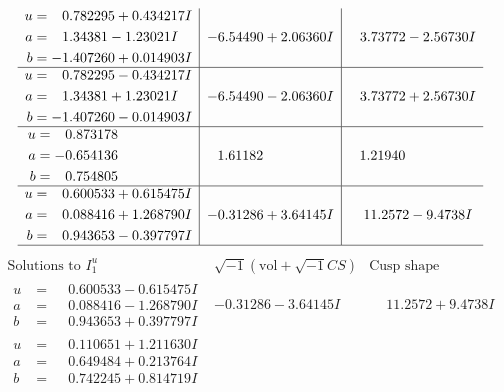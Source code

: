 \documentclass[1p]{elsarticle_modified}
\theoremstyle{definition}
\newcommand{\I}{\sqrt{-1}}
\begin{document}
$$\begin{array}{c|c|c}
\begin{aligned}
u &= \phantom{-}0.782295 + 0.434217 I \\
a &= \phantom{-}1.34381 - 1.23021 I \\
b &= -1.407260 + 0.014903 I\end{aligned}
 & -6.54490 + 2.06360 I & \phantom{-}3.73772 - 2.56730 I \\ \hline\begin{aligned}
u &= \phantom{-}0.782295 - 0.434217 I \\
a &= \phantom{-}1.34381 + 1.23021 I \\
b &= -1.407260 - 0.014903 I\end{aligned}
 & -6.54490 - 2.06360 I & \phantom{-}3.73772 + 2.56730 I \\ \hline\begin{aligned}
u &= \phantom{-}0.873178\phantom{ +0.000000I} \\
a &= -0.654136\phantom{ +0.000000I} \\
b &= \phantom{-}0.754805\phantom{ +0.000000I}\end{aligned}
 & \phantom{-}1.61182\phantom{ +0.000000I} & \phantom{-}1.21940\phantom{ +0.000000I} \\ \hline\begin{aligned}
u &= \phantom{-}0.600533 + 0.615475 I \\
a &= \phantom{-}0.088416 + 1.268790 I \\
b &= \phantom{-}0.943653 - 0.397797 I\end{aligned}
 & -0.31286 + 3.64145 I & \phantom{-}11.2572 - 9.4738 I\\
 \hline 
 \end{array}$$\newpage$$\begin{array}{c|c|c}  
\text{Solutions to }I^u_{1}& \I (\text{vol} + \sqrt{-1}CS) & \text{Cusp shape}\\
 \hline 
\begin{aligned}
u &= \phantom{-}0.600533 - 0.615475 I \\
a &= \phantom{-}0.088416 - 1.268790 I \\
b &= \phantom{-}0.943653 + 0.397797 I\end{aligned}
 & -0.31286 - 3.64145 I & \phantom{-}11.2572 + 9.4738 I \\ \hline\begin{aligned}
u &= \phantom{-}0.110651 + 1.211630 I \\
a &= \phantom{-}0.649484 + 0.213764 I \\
b &= \phantom{-}0.742245 + 0.814719 I\end{aligned}

\end{array}$$
\end{document}
